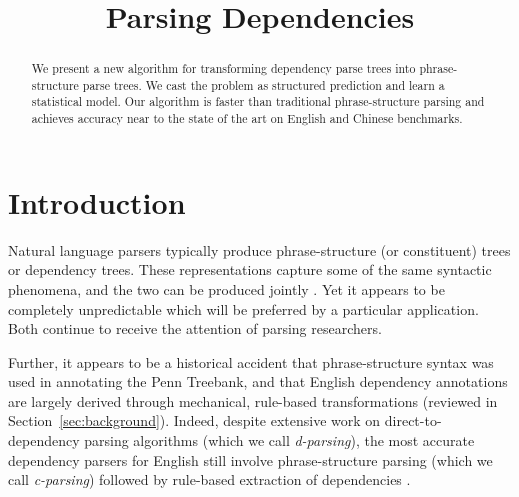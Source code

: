 \documentclass[11pt,letterpaper]{article}
\title{Parsing Dependencies}
\author{}
\date{}
\newcommand{\nascomment}[1]{\textcolor{blue}{\bf \small [#1 --nas]}}
\begin{document}
\maketitle
\begin{abstract}
We present a new algorithm for transforming dependency parse trees into
phrase-structure parse trees.  We cast the problem as  structured
prediction and learn a statistical model.  Our algorithm is faster than traditional
phrase-structure parsing and achieves accuracy near to the state of
the art on English and Chinese benchmarks.




\end{abstract}

\section{Introduction}


Natural language parsers typically produce phrase-structure (or
constituent) trees or dependency trees.  These representations capture
some of the same syntactic phenomena, and the two can be produced
jointly \cite{carreras2008tag,rush2010dual}.  Yet it
appears to be completely unpredictable which will be preferred by a
particular application.  Both continue to receive the attention of
parsing researchers.


Further, it appears to be a historical accident that phrase-structure
syntax was used in annotating the Penn Treebank, and that English
dependency annotations are largely derived through mechanical,
rule-based transformations (reviewed in Section~\ref{sec:background}).  Indeed,
despite extensive work on direct-to-dependency parsing algorithms
(which we call \emph{d-parsing}), the most accurate dependency
parsers for English still involve phrase-structure parsing (which we
call \emph{c-parsing}) followed by rule-based extraction of
dependencies \cite{kong2014empirical}.
\end{document}
